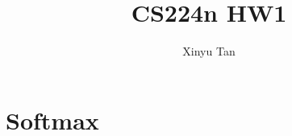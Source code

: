 \documentclass[12pt]{article}
\begin{document}
\title{CS224n HW1}
\author{Xinyu Tan}
\maketitle

\section {Softmax}
\end{document}
